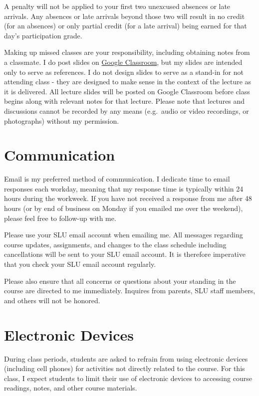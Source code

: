 \documentclass[]{book}
\theoremstyle{definition}
\theoremstyle{definition}
\theoremstyle{definition}
\theoremstyle{remark}
\begin{document}
A penalty will not be applied to your first two unexcused absences or
late arrivals. Any absences or late arrivals beyond those two will
result in no credit (for an absences) or only partial credit (for a late
arrival) being earned for that day's participation grade.

Making up missed classes are your responsibility, including obtaining
notes from a classmate. I do post slides on
\href{https://classroom.google.com}{Google Classroom}, but my slides are
intended only to serve as references. I do not design slides to serve as
a stand-in for not attending class - they are designed to make sense in
the context of the lecture as it is delivered. All lecture slides will
be posted on Google Classroom before class begins along with relevant
notes for that lecture. Please note that lectures and discussions cannot
be recorded by any means (e.g.~audio or video recordings, or
photographs) without my permission.

\hypertarget{communication}{%
\section{Communication}\label{communication}}

Email is my preferred method of communication. I dedicate time to email
responses each workday, meaning that my response time is typically
within 24 hours during the workweek. If you have not received a response
from me after 48 hours (or by end of business on Monday if you emailed
me over the weekend), please feel free to follow-up with me.

Please use your SLU email account when emailing me. All messages
regarding course updates, assignments, and changes to the class schedule
including cancellations will be sent to your SLU email account. It is
therefore imperative that you check your SLU email account regularly.

Please also ensure that all concerns or questions about your standing in
the course are directed to me immediately. Inquires from parents, SLU
staff members, and others will not be honored.

\hypertarget{electronic-devices}{%
\section{Electronic Devices}\label{electronic-devices}}

During class periods, students are asked to refrain from using
electronic devices (including cell phones) for activities not directly
related to the course. For this class, I expect students to limit their
use of electronic devices to accessing course readings, notes, and other
course materials.
\end{document}

